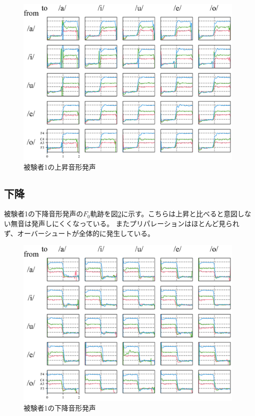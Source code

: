 \documentclass[10.5ptj,a4j,dvipdfmx,uplatex, oneside, openany, report]{jsbook}%
\begin{document}
\begin{figure}[htbp]
    \begin{center}
      \includegraphics[clip,width=16.0cm]{up1.png}
      \caption{被験者1の上昇音形発声}
      \label{u1}
    \end{center}
\end{figure}

\subsection{下降}
被験者1の下降音形発声の$F_0$軌跡を図\ref{d1}に示す。こちらは上昇と比べると意図しない無音は発声しにくくなっている。
またプリパレーションはほとんど見られず、オーバーシュートが全体的に発生している。

\begin{figure}[htbp]
    \begin{center}
      \includegraphics[clip,width=16.0cm]{down1.png}
      \caption{被験者1の下降音形発声}
      \label{d1}
    \end{center}
\end{figure}
\end{document}
